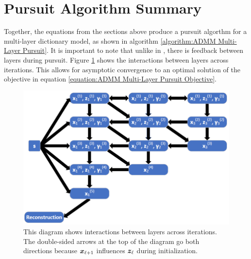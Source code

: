 \section{Pursuit Algorithm Summary}
Together, the equations from the sections above produce a pursuit algorthm for a multi-layer dictionary model, as shown in algorithm \ref{algorithm:ADMM Multi-Layer Pursuit}. It is important to note that unlike in \cite{zeiler2010deconvolutional}, there is feedback between layers during pursuit.  Figure \ref{figure:ADMM Multi-Layer Pursuit Diagram} shows the interactions between layers across iterations. This allows for asymptotic convergence to an optimal solution of the objective in equation \ref{equation:ADMM Multi-Layer Pursuit Objective}.
\begin{figure}
	\includegraphics[width=\textwidth]{figures/multi-layer_ADMM-node-dependencies.PNG}
	\caption{This diagram shows interactions between layers across iterations. The double-sided arrows at the top of the diagram go both directions because $\bm{x}_{\ell + 1}$ influences $\bm{z}_{\ell}$ during initialization.}
	\label{figure:ADMM Multi-Layer Pursuit Diagram}
\end{figure}
